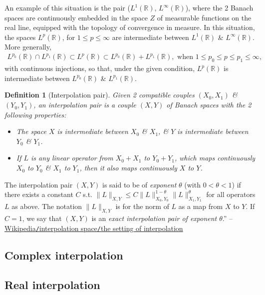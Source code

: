 \documentclass[oneside]{book}
\numberwithin{equation}{section}
\newtheorem{definition}{Definition}[chapter]
\begin{document}
An example of this situation is the pair ($L^1(\mathbb{R})$, $L^\infty(\mathbb{R})$), where the 2 Banach spaces are continuously embedded in the space $Z$ of measurable functions on the real line, equipped with the topology of convergence in measure. In this situation, the spaces $L^p(\mathbb{R})$, for $1\le p\le\infty$ are intermediate between $L^1(\mathbb{R})$ \& $L^\infty(\mathbb{R})$. More generally,
\begin{align*}
	L^{p_0}(\mathbb{R})\cap L^{p_1}(\mathbb{R})\subset L^p(\mathbb{R})\subset L^{p_0}(\mathbb{R}) + L^{p_1}(\mathbb{R}),\mbox{ when } 1\le p_0\le p\le p_1\le\infty,
\end{align*}
with continuous injections, so that, under the given condition, $L^p(\mathbb{R})$ is intermediate between $L^{p_0}(\mathbb{R})$ \& $L^{p_1}(\mathbb{R})$.

\begin{definition}[Interpolation pair]
	Given 2 compatible couples $(X_0,X_1)$ \& $(Y_0,Y_1)$, an \emph{interpolation pair} is a couple $(X,Y)$ of Banach spaces with the 2 following properties:
	\begin{itemize}
		\item The space $X$ is intermediate between $X_0$ \& $X_1$, \& $Y$ is intermediate between $Y_0$ \& $Y_1$.
		\item If $L$ is any linear operator from $X_0 + X_1$ to $Y_0 + Y_1$, which maps continuously $X_0$ to $Y_0$ \& $X_1$ to $Y_1$, then it also maps continuously $X$ to $Y$.
	\end{itemize}
\end{definition}
The interpolation pair $(X,Y)$ is said to be of \textit{exponent} $\theta$ (with $0 < \theta < 1$) if there exists a constant $C$ s.t. $\|L\|_{X,Y}\le C\|L\|_{X_0,Y_0}^{1-\theta}\|L\|_{X_1,Y_1}^\theta$ for all operators $L$ as above. The notation $\|L\|_{X,Y}$  is for the norm of $L$ as a map from $X$ to $Y$. If $C = 1$, we say that $(X,Y)$ is an \textit{exact interpolation pair of exponent $\theta$}.'' -- \href{https://en.wikipedia.org/wiki/Interpolation_space#The_setting_of_interpolation}{Wikipedia\texttt{/}interpolation space\texttt{/}the setting of interpolation}

\subsection{Complex interpolation}

\subsection{Real interpolation}
\end{document}
